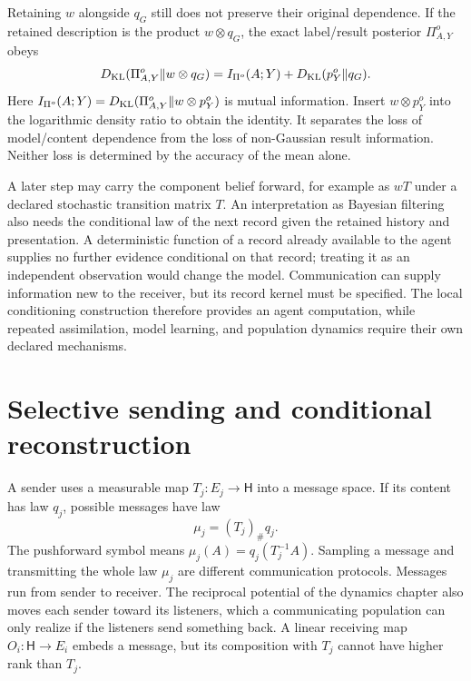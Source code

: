 Retaining $w$ alongside $q_G$ still does not preserve their original dependence. If the retained description is the product $w\otimes q_G$, the exact label/result posterior $\Pi_{A,Y}^o$ obeys
\begin{equation}
D_{\mathrm{KL}}(\Pi_{A,Y}^o\Vert w\otimes q_G)
=I_{\Pi^o}(A;Y)+D_{\mathrm{KL}}(p_Y^o\Vert q_G).
\label{comp:eq-memory-retention-loss}
\end{equation}
Here $I_{\Pi^o}(A;Y)=D_{\mathrm{KL}}(\Pi_{A,Y}^o\Vert w\otimes p_Y^o)$ is mutual information. Insert $w\otimes p_Y^o$ into the logarithmic density ratio to obtain the identity. It separates the loss of model/content dependence from the loss of non-Gaussian result information. Neither loss is determined by the accuracy of the mean alone.

A later step may carry the component belief forward, for example as $wT$ under a declared stochastic transition matrix $T$. An interpretation as Bayesian filtering also needs the conditional law of the next record given the retained history and presentation. A deterministic function of a record already available to the agent supplies no further evidence conditional on that record; treating it as an independent observation would change the model. Communication can supply information new to the receiver, but its record kernel must be specified. The local conditioning construction therefore provides an agent computation, while repeated assimilation, model learning, and population dynamics require their own declared mechanisms.



\section{Selective sending and conditional reconstruction}

A sender uses a measurable map $T_j:E_j\to\mathsf H$ into a message space. If its content has law $q_j$, possible messages have law
\begin{equation}
\mu_j=(T_j)_\#q_j.
\label{comp:eq-message-law}
\end{equation}
The pushforward symbol means $\mu_j(A)=q_j(T_j^{-1}A)$. Sampling a message and transmitting the whole law $\mu_j$ are different communication protocols. Messages run from sender to receiver. The reciprocal potential of the dynamics chapter also moves each sender toward its listeners, which a communicating population can only realize if the listeners send something back. A linear receiving map $O_i:\mathsf H\to E_i$ embeds a message, but its composition with $T_j$ cannot have higher rank than $T_j$.

